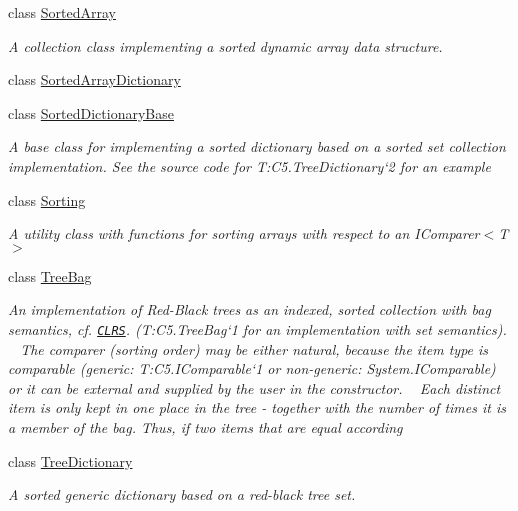 \begin{DoxyCompactItemize}
\item 
class \hyperlink{class_c5_1_1_sorted_array}{Sorted\+Array}
\begin{DoxyCompactList}\small\item\em A collection class implementing a sorted dynamic array data structure. \end{DoxyCompactList}\item 
class \hyperlink{class_c5_1_1_sorted_array_dictionary}{Sorted\+Array\+Dictionary}
\item 
class \hyperlink{class_c5_1_1_sorted_dictionary_base}{Sorted\+Dictionary\+Base}
\begin{DoxyCompactList}\small\item\em A base class for implementing a sorted dictionary based on a sorted set collection implementation. {\itshape See the source code for T\+:\+C5.\+Tree\+Dictionary`2 for an example} \end{DoxyCompactList}\item 
class \hyperlink{class_c5_1_1_sorting}{Sorting}
\begin{DoxyCompactList}\small\item\em A utility class with functions for sorting arrays with respect to an I\+Comparer$<$T$>$ \end{DoxyCompactList}\item 
class \hyperlink{class_c5_1_1_tree_bag}{Tree\+Bag}
\begin{DoxyCompactList}\small\item\em An implementation of Red-\/\+Black trees as an indexed, sorted collection with bag semantics, cf. \href{litterature.htm#CLRS}{\tt C\+L\+R\+S}. (T\+:\+C5.\+Tree\+Bag`1 for an implementation with set semantics). ~\newline
 The comparer (sorting order) may be either natural, because the item type is comparable (generic\+: T\+:\+C5.\+I\+Comparable`1 or non-\/generic\+: System.\+I\+Comparable) or it can be external and supplied by the user in the constructor. ~\newline
 Each distinct item is only kept in one place in the tree -\/ together with the number of times it is a member of the bag. Thus, if two items that are equal according \end{DoxyCompactList}\item 
class \hyperlink{class_c5_1_1_tree_dictionary}{Tree\+Dictionary}
\begin{DoxyCompactList}\small\item\em A sorted generic dictionary based on a red-\/black tree set. \end{DoxyCompactList}\item 

\end{DoxyCompactItemize}
